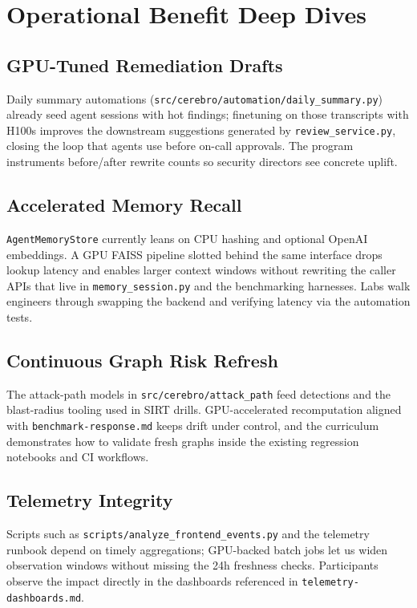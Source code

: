 \documentclass[11pt]{scrartcl}
\begin{document}
\section{Operational Benefit Deep Dives}
\subsection*{GPU-Tuned Remediation Drafts}
Daily summary automations (\texttt{src/cerebro/automation/daily\_summary.py}) already seed agent sessions with hot findings; finetuning on those transcripts with H100s improves the downstream suggestions generated by \texttt{review\_service.py}, closing the loop that agents use before on-call approvals. The program instruments before/after rewrite counts so security directors see concrete uplift.

\subsection*{Accelerated Memory Recall}
\texttt{AgentMemoryStore} currently leans on CPU hashing and optional OpenAI embeddings. A GPU FAISS pipeline slotted behind the same interface drops lookup latency and enables larger context windows without rewriting the caller APIs that live in \texttt{memory\_session.py} and the benchmarking harnesses. Labs walk engineers through swapping the backend and verifying latency via the automation tests.

\subsection*{Continuous Graph Risk Refresh}
The attack-path models in \texttt{src/cerebro/attack\_path} feed detections and the blast-radius tooling used in SIRT drills. GPU-accelerated recomputation aligned with \texttt{benchmark-response.md} keeps drift under control, and the curriculum demonstrates how to validate fresh graphs inside the existing regression notebooks and CI workflows.

\subsection*{Telemetry Integrity}
Scripts such as \texttt{scripts/analyze\_frontend\_events.py} and the telemetry runbook depend on timely aggregations; GPU-backed batch jobs let us widen observation windows without missing the 24h freshness checks. Participants observe the impact directly in the dashboards referenced in \texttt{telemetry-dashboards.md}.
\end{document}
